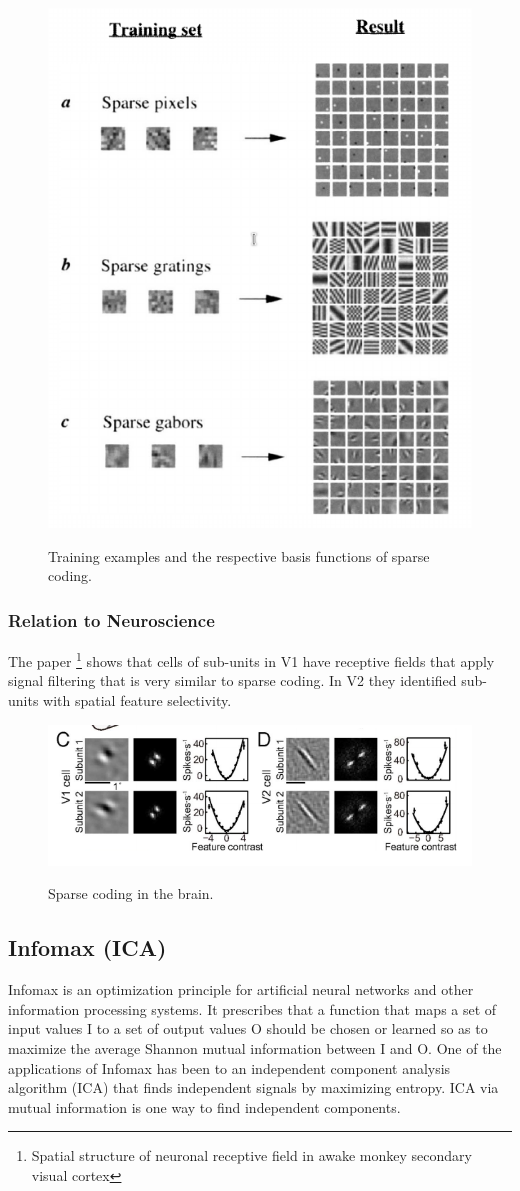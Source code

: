 \documentclass[main]{subfiles}
\begin{document}
\begin{figure}[H]
	\centering
	\includegraphics[width=0.5\linewidth]{07_UnsupervisedAndSelfsupervisedLearning/figures/sparse-coding-filters.png}
	\label{fig:sparse-coding-filters}
	\caption{Training examples and the respective basis functions of sparse coding.}
\end{figure}

\subsubsection{Relation to Neuroscience}
The paper \footnote{Spatial structure of neuronal receptive field in awake monkey secondary visual cortex} shows that cells of sub-units in V1 have receptive fields that apply signal filtering that is very similar to sparse coding. In V2 they identified sub-units with spatial feature selectivity.

\begin{figure}[H]
	\centering
	\includegraphics[width=0.5\linewidth]{07_UnsupervisedAndSelfsupervisedLearning/figures/sparse-coding-brain.png}
	\label{fig:sparse-coding-brain}
	\caption{Sparse coding in the brain.}
\end{figure}


\subsection{Infomax (ICA)}
Infomax is an optimization principle for artificial neural networks and other information processing systems. It prescribes that a function that maps a set of input values I to a set of output values O should be chosen or learned so as to maximize the average Shannon mutual information between I and O. One of the applications of Infomax has been to an independent component analysis algorithm (ICA) that finds independent signals by maximizing entropy. ICA via mutual information is one way to find independent components.
\end{document}

